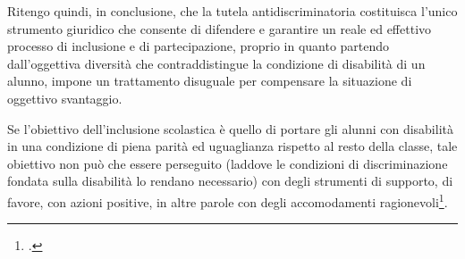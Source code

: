 Ritengo quindi, in conclusione, che la tutela antidiscriminatoria costituisca l'unico strumento giuridico che consente di difendere e garantire un reale ed effettivo processo di inclusione e di partecipazione, proprio in quanto partendo dall'oggettiva diversità che contraddistingue la condizione di disabilità di un alunno, impone un trattamento disuguale per compensare la situazione di oggettivo svantaggio.

Se l'obiettivo dell'inclusione scolastica è quello di portare gli alunni con disabilità in una condizione di piena parità ed uguaglianza rispetto al resto della classe, tale obiettivo non può che essere perseguito (laddove le condizioni di discriminazione fondata sulla disabilità lo rendano necessario) con degli strumenti di supporto, di favore, con azioni positive, in altre parole con degli accomodamenti ragionevoli\footcite{Luca2014}.

